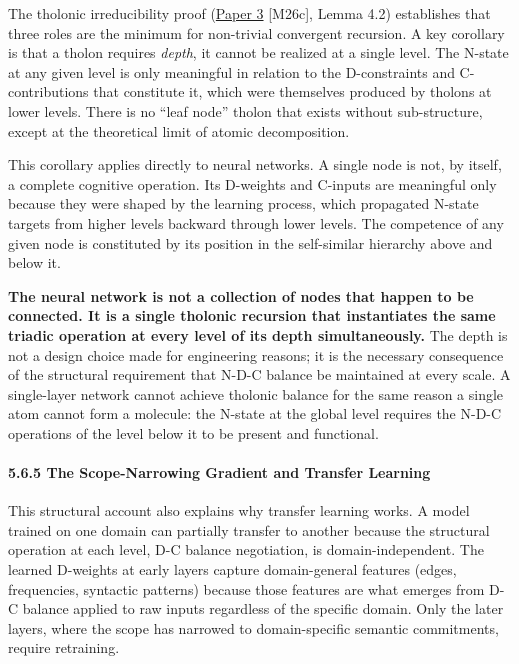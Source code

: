 \documentclass[
  11pt,
  letterpaper,
]{article}
\begin{document}
The tholonic irreducibility proof
(\href{https://github.com/baardev/truevalue/blob/main/docnav/Research/papers/3_minimal-recursive-triadic-framework/3_minimal-recursive-triadic-framework.pdf}{Paper
3} {[}M26c{]}, Lemma 4.2) establishes that three roles are the minimum
for non-trivial convergent recursion. A key corollary is that a tholon
requires \emph{depth}, it cannot be realized at a single level. The
N-state at any given level is only meaningful in relation to the
D-constraints and C-contributions that constitute it, which were
themselves produced by tholons at lower levels. There is no ``leaf
node'' tholon that exists without sub-structure, except at the
theoretical limit of atomic decomposition.

This corollary applies directly to neural networks. A single node is
not, by itself, a complete cognitive operation. Its D-weights and
C-inputs are meaningful only because they were shaped by the learning
process, which propagated N-state targets from higher levels backward
through lower levels. The competence of any given node is constituted by
its position in the self-similar hierarchy above and below it.

\textbf{The neural network is not a collection of nodes that happen to
be connected. It is a single tholonic recursion that instantiates the
same triadic operation at every level of its depth simultaneously.} The
depth is not a design choice made for engineering reasons; it is the
necessary consequence of the structural requirement that N-D-C balance
be maintained at every scale. A single-layer network cannot achieve
tholonic balance for the same reason a single atom cannot form a
molecule: the N-state at the global level requires the N-D-C operations
of the level below it to be present and functional.

\paragraph{5.6.5 The Scope-Narrowing Gradient and Transfer
Learning}\label{the-scope-narrowing-gradient-and-transfer-learning}

This structural account also explains why transfer learning works. A
model trained on one domain can partially transfer to another because
the structural operation at each level, D-C balance negotiation, is
domain-independent. The learned D-weights at early layers capture
domain-general features (edges, frequencies, syntactic patterns) because
those features are what emerges from D-C balance applied to raw inputs
regardless of the specific domain. Only the later layers, where the
scope has narrowed to domain-specific semantic commitments, require
retraining.
\end{document}
